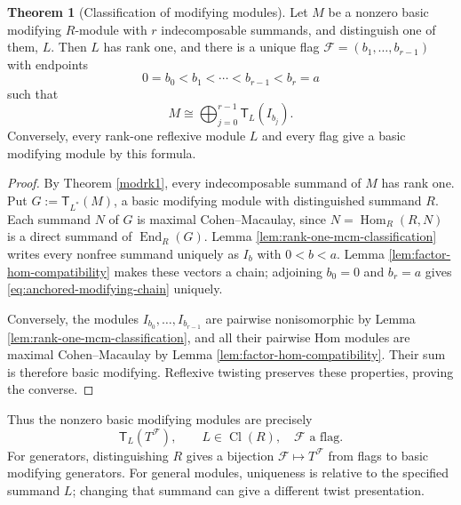 \documentclass[a4paper,reqno]{amsart}
\def\F{\mathcal{F}}
\DeclareMathOperator{\Hom}{Hom}
\DeclareMathOperator{\End}{End}
\DeclareMathOperator{\Cl}{Cl}
\theoremstyle{definition}
\newtheorem{Thm}{Theorem}[section]
\begin{document}
\begin{Thm}[Classification of modifying modules]\label{thm:modifying-classification}
Let $M$ be a nonzero basic modifying $R$-module with $r$ indecomposable summands, and distinguish one of them, $L$. Then $L$ has rank one, and there is a unique flag $\F=(b_1,\ldots,b_{r-1})$ with endpoints
\begin{equation}\label{eq:anchored-modifying-chain}
0=b_0<b_1<\cdots<b_{r-1}<b_r=a
\end{equation}
such that
\[
M\cong\bigoplus_{j=0}^{r-1}\mathsf T_L(I_{b_j}).
\]
Conversely, every rank-one reflexive module $L$ and every flag give a basic modifying module by this formula.
\end{Thm}
\begin{proof}
By Theorem \ref{modrk1}, every indecomposable summand of $M$ has rank one. Put $G:=\mathsf T_{L^*}(M)$, a basic modifying module with distinguished summand $R$. Each summand $N$ of $G$ is maximal Cohen--Macaulay, since $N=\Hom_R(R,N)$ is a direct summand of $\End_R(G)$. Lemma \ref{lem:rank-one-mcm-classification} writes every nonfree summand uniquely as $I_b$ with $0<b<a$. Lemma \ref{lem:factor-hom-compatibility} makes these vectors a chain; adjoining $b_0=0$ and $b_r=a$ gives \eqref{eq:anchored-modifying-chain} uniquely.

Conversely, the modules $I_{b_0},\ldots,I_{b_{r-1}}$ are pairwise nonisomorphic by Lemma \ref{lem:rank-one-mcm-classification}, and all their pairwise Hom modules are maximal Cohen--Macaulay by Lemma \ref{lem:factor-hom-compatibility}. Their sum is therefore basic modifying. Reflexive twisting preserves these properties, proving the converse.
\end{proof}

Thus the nonzero basic modifying modules are precisely
\begin{equation}\label{eq:modifying-flag-classification}
\mathsf T_L(T^\F),\qquad L\in\Cl(R),\quad\F\text{ a flag}.
\end{equation}
For generators, distinguishing $R$ gives a bijection $\F\mapsto T^\F$ from flags to basic modifying generators. For general modules, uniqueness is relative to the specified summand $L$; changing that summand can give a different twist presentation.
\end{document}

